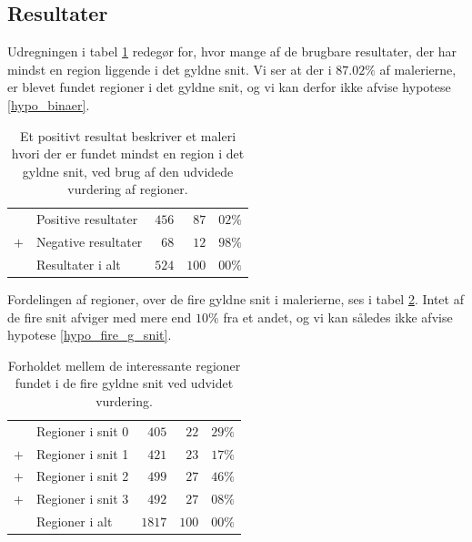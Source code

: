 {\subsection{Resultater}
Udregningen i tabel \ref{ud_tabel_fordeling} redegør for, hvor mange af
de brugbare resultater, der har mindst en region liggende i det gyldne
snit. Vi ser at der i $87.02\%$ af malerierne, er blevet fundet regioner
i det gyldne snit, og vi kan derfor ikke afvise hypotese
\ref{hypo_binaer}.

\begin{table}[H]
    \centering
    \begin{tabular}{r@{\ \ }p{12em}r|r@{.}l}
            & Positive resultater   & $456$ &  $87$ & $02\%$ \\
        $+$ & Negative resultater   &  $68$ &  $12$ & $98\%$ \\\hline
            & Resultater i alt      & $524$ & $100$ & $00\%$
    \end{tabular}
    \caption[]{Et positivt resultat beskriver et maleri hvori der er
    fundet mindst en region i det gyldne snit, ved brug af den udvidede
    vurdering af regioner.}
    \label{ud_tabel_fordeling}
\end{table}

Fordelingen af regioner, over de fire gyldne snit i malerierne, ses i
tabel \ref{ud_tabel_fire_snit}. Intet af de fire snit afviger med
mere end $10\%$ fra et andet, og vi kan således ikke afvise hypotese
\ref{hypo_fire_g_snit}.

\begin{table}[H]
    \centering
    \begin{tabular}{r@{\ \ }p{12em}r|r@{.}l}
            & Regioner i snit 0   &  $405$ &  $22$ & $29\%$ \\
        $+$ & Regioner i snit 1   &  $421$ &  $23$ & $17\%$ \\
        $+$ & Regioner i snit 2   &  $499$ &  $27$ & $46\%$ \\
        $+$ & Regioner i snit 3   &  $492$ &  $27$ & $08\%$ \\\hline
            & Regioner i alt      & $1817$ & $100$ & $00\%$
    \end{tabular}
    \caption[]{Forholdet mellem de interessante regioner fundet i de
    fire gyldne snit ved udvidet vurdering.}
    \label{ud_tabel_fire_snit}
\end{table}

}

